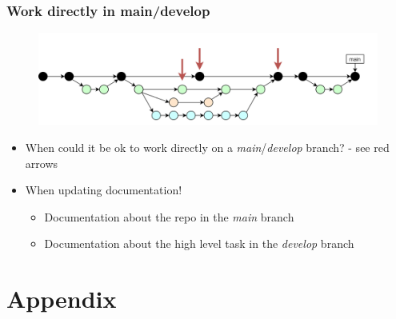 \documentclass[aspectratio=169]{beamer} %
\begin{document}
\begin{frame}
	\frametitle{Work directly in main/develop}

	\vspace{-.5cm}
	\begin{minipage}[t][5cm][t]{\textwidth}
		\begin{figure}
			\centering
			\includegraphics[width=\textwidth]{./img/dime-gitflow-network-workdirectly.png}
		\end{figure}
	\end{minipage}

	\vspace{-.5cm}
	\begin{minipage}[t][5cm][t]{\textwidth}
		\begin{itemize}
			\setlength\itemsep{.5em}
			\item <1->When could it be ok to work directly on a \textit{main}/\textit{develop} branch? - see red arrows
			\item <2->When updating documentation!
			\begin{itemize}
				\setlength\itemsep{.5em}
				\item <2->Documentation about the repo in the \textit{main} branch
				\item <2->Documentation about the high level task in the \textit{develop} branch
			\end{itemize}
		\end{itemize}
	\end{minipage}
\end{frame}






\section{Appendix}
\end{document}

